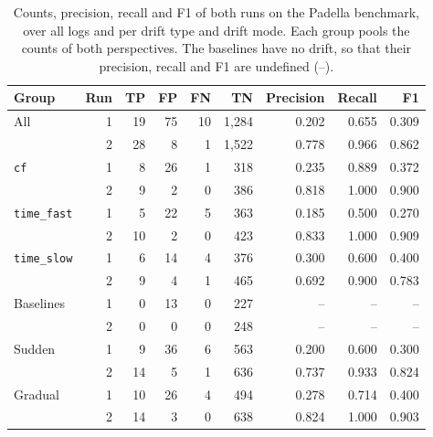\begin{table}[tb]
	\centering
	\caption[Results on the Padella benchmark]{%
		Counts, precision, recall and F1 of both runs on the Padella benchmark, over all logs and per drift type and drift mode. Each group pools the counts of both perspectives. The baselines have no drift, so that their precision, recall and F1 are undefined (--).}
	\label{tab:eval:padella:metrics}
	\small
	\begin{tabular}{@{}l|r|r|r|r|r|r|r|r@{}}
		\hline
		Group               & Run & TP & FP & FN & TN    & Precision & Recall & F1    \\
		\hline
		All                 & 1   & 19 & 75 & 10 & 1,284 & 0.202     & 0.655  & 0.309 \\
		                    & 2   & 28 & 8  & 1  & 1,522 & 0.778     & 0.966  & 0.862 \\
		\hline
		\texttt{cf}         & 1   & 8  & 26 & 1  & 318   & 0.235     & 0.889  & 0.372 \\
		                    & 2   & 9  & 2  & 0  & 386   & 0.818     & 1.000  & 0.900 \\
		\texttt{time\_fast} & 1   & 5  & 22 & 5  & 363   & 0.185     & 0.500  & 0.270 \\
		                    & 2   & 10 & 2  & 0  & 423   & 0.833     & 1.000  & 0.909 \\
		\texttt{time\_slow} & 1   & 6  & 14 & 4  & 376   & 0.300     & 0.600  & 0.400 \\
		                    & 2   & 9  & 4  & 1  & 465   & 0.692     & 0.900  & 0.783 \\
		Baselines           & 1   & 0  & 13 & 0  & 227   & --        & --     & --    \\
		                    & 2   & 0  & 0  & 0  & 248   & --        & --     & --    \\
		\hline
		Sudden              & 1   & 9  & 36 & 6  & 563   & 0.200     & 0.600  & 0.300 \\
		                    & 2   & 14 & 5  & 1  & 636   & 0.737     & 0.933  & 0.824 \\
		Gradual             & 1   & 10 & 26 & 4  & 494   & 0.278     & 0.714  & 0.400 \\
		                    & 2   & 14 & 3  & 0  & 638   & 0.824     & 1.000  & 0.903 \\
		\hline
	\end{tabular}
\end{table}

